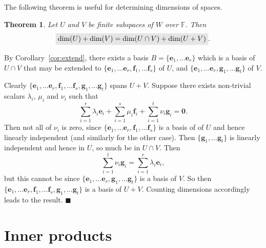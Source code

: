 \documentclass[letter-paper]{tufte-book}
\newtheorem{theorem}{\color{pastel-blue}Theorem}[section]
\newenvironment{proof}[1][Proof]{\begin{trivlist}
\item[\hskip \labelsep {\bfseries #1}]}{\end{trivlist}}
\newcommand{\eb}{{\boldsymbol{e}}}
\newcommand{\qed}{\hfill$\blacksquare$}
\newcommand{\highlight}[1]{\mathchoice%
  {\colorbox{black!10}{$\displaystyle#1$}}%
  {\colorbox{black!10}{$\textstyle#1$}}%
  {\colorbox{black!10}{$\scriptstyle#1$}}%
  {\colorbox{black!10}{$\scriptscriptstyle#1$}}}%
\begin{document}
The following theorem is useful for determining dimensions of spaces.

\begin{theorem}
  Let $U$ and $V$ be finite subspaces of $W$ over $\mathbb{F}$. Then
  \begin{equation}
    \highlight{\mbox{dim}(U) + \mbox{dim}(V) = \mbox{dim}(U \cap V) + \mbox{dim}(U+V)}.
  \end{equation}
\end{theorem}

\begin{proof}
  By Corollary~\ref{cor:extend}, there exists a basis $B=\{\eb_1, \ldots
  \eb_r\}$ which is a basis of $U \cap V$ that may be extended to $\{\eb_1,
  \ldots \eb_r, \boldsymbol{f}_1, \ldots \boldsymbol{f}_s\}$ of $U$, and
  $\{\eb_1, \ldots \eb_r, \boldsymbol{g}_1, \ldots \boldsymbol{g}_t\}$ of $V$.
  
  Clearly $\{\eb_1, \ldots \eb_r, \boldsymbol{f}_1, \ldots \boldsymbol{f}_s,
  \boldsymbol{g}_1, \ldots \boldsymbol{g}_t\}$ spans $U+V$. Suppose there exists
  non-trivial scalars $\lambda_i$, $\mu_i$ and $\nu_i$ such that
  \begin{equation*}
    \sum_{i=1}^r \lambda_i\eb_i + \sum_{i=1}^s \mu_i\boldsymbol{f}_i + \sum_{i=1}^t \nu_i\boldsymbol{g}_i = \boldsymbol{0}.
  \end{equation*}
  Then not all of $\nu_i$ is zero, since $\{\eb_1,
  \ldots \eb_r, \boldsymbol{f}_1, \ldots \boldsymbol{f}_s\}$ is a basis of of
  $U$ and hence linearly independent (and similarly for the other case). Then
  $\{\boldsymbol{g}_1, \ldots \boldsymbol{g}_t\}$ is linearly independent and
  hence in $U$, so much be in $U \cap V$. Then
  \begin{equation*}
    \sum_{i=1}^t \nu_i\boldsymbol{g}_i = \sum_{i=1}^r \lambda_i\eb_i,
  \end{equation*}
  but this cannot be since $\{\eb_1, \ldots \eb_r, \boldsymbol{g}_1, \ldots
  \boldsymbol{g}_t\}$ is a basis of $V$. So then $\{\eb_1, \ldots \eb_r,
  \boldsymbol{f}_1, \ldots \boldsymbol{f}_s, \boldsymbol{g}_1, \ldots
  \boldsymbol{g}_t\}$ is a basis of $U+V$. Counting dimensions accordingly leads
  to the result. \qed
\end{proof}


\section{Inner products}
\end{document}
